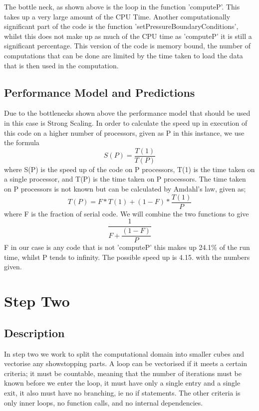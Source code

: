 \documentclass[paper=a4, fontsize=11pt]{scrartcl}
\numberwithin{equation}{section}		%
\numberwithin{figure}{section}			%
\numberwithin{table}{section}				%
\begin{document}
The bottle neck, as shown above is the loop in the function 'computeP'. This takes up a very large amount of the CPU Time. Another computationally significant part of the code is the function 'setPressureBoundaryConditions', whilst this does not make up as much of the CPU time as 'computeP' it is still a significant percentage. This version of the code is memory bound, the number of computations that can be done are limited by the time taken to load the data that is then used in the computation. 

\subsection{Performance Model and Predictions}

Due to the bottlenecks shown above the performance model that should be used in this case is Strong Scaling. In order to calculate the speed up in execution of this code on a higher number of processors, given as P in this instance, we use the formula \[S(P) = \dfrac{T(1)}{T(P)}\] where S(P) is the speed up of the code on P processors, T(1) is the time taken on a single processor, and T(P) is the time taken on P processors. The time taken on P processors is not known but can be calculated by Amdahl's law, given as; \[T(P) = F * T(1) + (1 - F) * \dfrac{T(1)}{P}\] where F is the fraction of serial code. We will combine the two functions to give \[ \dfrac{1}{F + \dfrac{(1 - F)}{P}} \] F in our case is any code that is not 'computeP' this makes up 24.1\% of the run time, whilst P tends to infinity. The possible speed up is 4.15. with the numbers given. 


\section{Step Two}
\subsection{Description}

In step two we work to split the computational domain into smaller cubes and vectorise any showstopping parts.  A loop can be vectorised if it meets a certain criteria; it must be countable, meaning that the number of iterations must be known before we enter the loop, it must have only a single entry and a  single exit, it also must have no branching, ie no if statements. The other criteria is only inner loops, no function calls, and no internal dependencies. 
\end{document}
